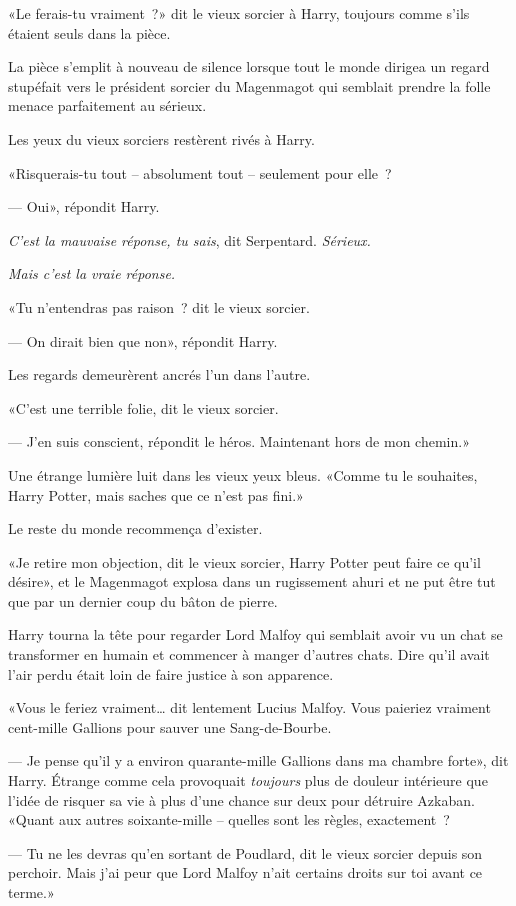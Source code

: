 «Le ferais-tu vraiment~?» dit le vieux sorcier à Harry, toujours comme s'ils étaient seuls dans la pièce.

La pièce s'emplit à nouveau de silence lorsque tout le monde dirigea un regard stupéfait vers le président sorcier du Magenmagot qui semblait prendre la folle menace parfaitement au sérieux.

Les yeux du vieux sorciers restèrent rivés à Harry.

«Risquerais-tu tout -- absolument tout -- seulement pour elle~?

--- Oui», répondit Harry.

\emph{C'est la mauvaise réponse, tu sais}, dit Serpentard. \emph{Sérieux.}

\emph{Mais c'est la vraie réponse.}

«Tu n'entendras pas raison~? dit le vieux sorcier.

--- On dirait bien que non», répondit Harry.

Les regards demeurèrent ancrés l'un dans l'autre.

«C'est une terrible folie, dit le vieux sorcier.

--- J'en suis conscient, répondit le héros. Maintenant hors de mon chemin.»

Une étrange lumière luit dans les vieux yeux bleus. «Comme tu le souhaites, Harry Potter, mais saches que ce n'est pas fini.»

Le reste du monde recommença d'exister.

«Je retire mon objection, dit le vieux sorcier, Harry Potter peut faire ce qu'il désire», et le Magenmagot explosa dans un rugissement ahuri et ne put être tut que par un dernier coup du bâton de pierre.

Harry tourna la tête pour regarder Lord Malfoy qui semblait avoir vu un chat se transformer en humain et commencer à manger d'autres chats. Dire qu'il avait l'air perdu était loin de faire justice à son apparence.

«Vous le feriez vraiment… dit lentement Lucius Malfoy. Vous paieriez vraiment cent-mille Gallions pour sauver une Sang-de-Bourbe.

--- Je pense qu'il y a environ quarante-mille Gallions dans ma chambre forte», dit Harry. Étrange comme cela provoquait \emph{toujours} plus de douleur intérieure que l'idée de risquer sa vie à plus d'une chance sur deux pour détruire Azkaban. «Quant aux autres soixante-mille -- quelles sont les règles, exactement~?

--- Tu ne les devras qu'en sortant de Poudlard, dit le vieux sorcier depuis son perchoir. Mais j'ai peur que Lord Malfoy n'ait certains droits sur toi avant ce terme.»

